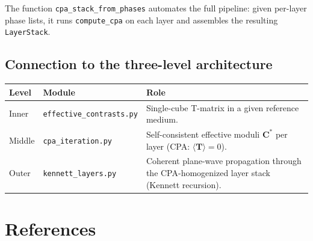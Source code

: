 \documentclass[11pt,a4paper]{article}
\newcommand{\bT}{\bm{T}}
\newcommand{\bC}{\bm{C}}
\begin{document}
The function \texttt{cpa\_stack\_from\_phases} automates the full
pipeline: given per-layer phase lists, it runs \texttt{compute\_cpa}
on each layer and assembles the resulting \texttt{LayerStack}.

\subsection{Connection to the three-level architecture}

\begin{center}
\renewcommand{\arraystretch}{1.3}
\begin{tabular}{llp{7.5cm}}
\toprule
\textbf{Level} & \textbf{Module} & \textbf{Role} \\
\midrule
Inner &
  \texttt{effective\_contrasts.py} &
  Single-cube T-matrix in a given reference medium. \\
Middle &
  \texttt{cpa\_iteration.py} &
  Self-consistent effective moduli $\bC^*$ per layer
  (CPA: $\langle\bT\rangle = 0$). \\
Outer &
  \texttt{kennett\_layers.py} &
  Coherent plane-wave propagation through the
  CPA-homogenized layer stack (Kennett recursion). \\
\bottomrule
\end{tabular}
\end{center}

\section{References}
\end{document}

